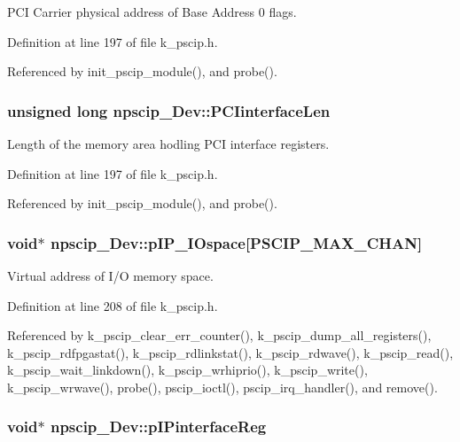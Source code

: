 PCI Carrier physical address of Base Address 0 flags. 



Definition at line 197 of file k\_\-pscip.h.

Referenced by init\_\-pscip\_\-module(), and probe().\hypertarget{structnpscip___dev_0142cc27edac10b4f03fecc945baceaa}{
\subsubsection[{PCIinterfaceLen}]{\setlength{\rightskip}{0pt plus 5cm}unsigned long {\bf npscip\_\-Dev::PCIinterfaceLen}}}
\label{structnpscip___dev_0142cc27edac10b4f03fecc945baceaa}


Length of the memory area hodling PCI interface registers. 



Definition at line 197 of file k\_\-pscip.h.

Referenced by init\_\-pscip\_\-module(), and probe().\hypertarget{structnpscip___dev_dc0a68164f555ddc4b5de6d4cf0bf0e9}{
\subsubsection[{pIP\_\-IOspace}]{\setlength{\rightskip}{0pt plus 5cm}void$\ast$ {\bf npscip\_\-Dev::pIP\_\-IOspace}\mbox{[}PSCIP\_\-MAX\_\-CHAN\mbox{]}}}
\label{structnpscip___dev_dc0a68164f555ddc4b5de6d4cf0bf0e9}


Virtual address of I/O memory space. 



Definition at line 208 of file k\_\-pscip.h.

Referenced by k\_\-pscip\_\-clear\_\-err\_\-counter(), k\_\-pscip\_\-dump\_\-all\_\-registers(), k\_\-pscip\_\-rdfpgastat(), k\_\-pscip\_\-rdlinkstat(), k\_\-pscip\_\-rdwave(), k\_\-pscip\_\-read(), k\_\-pscip\_\-wait\_\-linkdown(), k\_\-pscip\_\-wrhiprio(), k\_\-pscip\_\-write(), k\_\-pscip\_\-wrwave(), probe(), pscip\_\-ioctl(), pscip\_\-irq\_\-handler(), and remove().\hypertarget{structnpscip___dev_55e32b14b74a1a31efa915f3ee30da2c}{
\subsubsection[{pIPinterfaceReg}]{\setlength{\rightskip}{0pt plus 5cm}void$\ast$ {\bf npscip\_\-Dev::pIPinterfaceReg}}}
\label{structnpscip___dev_55e32b14b74a1a31efa915f3ee30da2c}


